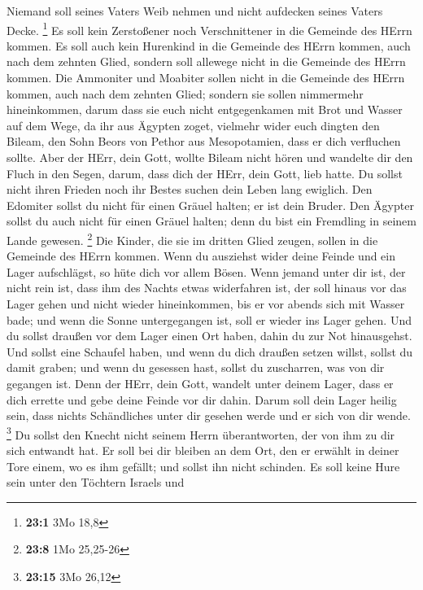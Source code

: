  Niemand soll seines Vaters Weib nehmen und nicht
aufdecken seines Vaters Decke. \footnote{\textbf{23:1} 3Mo 18,8}
 Es soll kein Zerstoßener noch Verschnittener in die
Gemeinde des HErrn kommen.  Es soll auch kein Hurenkind in
die Gemeinde des HErrn kommen, auch nach dem zehnten Glied, sondern soll
allewege nicht in die Gemeinde des HErrn kommen.  Die
Ammoniter und Moabiter sollen nicht in die Gemeinde des HErrn kommen,
auch nach dem zehnten Glied; sondern sie sollen nimmermehr hineinkommen,
 darum dass sie euch nicht entgegenkamen mit Brot und
Wasser auf dem Wege, da ihr aus Ägypten zoget, vielmehr wider euch
dingten den Bileam, den Sohn Beors von Pethor aus Mesopotamien, dass er
dich verfluchen sollte.  Aber der HErr, dein Gott, wollte
Bileam nicht hören und wandelte dir den Fluch in den Segen, darum, dass
dich der HErr, dein Gott, lieb hatte.  Du sollst nicht
ihren Frieden noch ihr Bestes suchen dein Leben lang ewiglich.
 Den Edomiter sollst du nicht für einen Gräuel halten; er
ist dein Bruder. Den Ägypter sollst du auch nicht für einen Gräuel
halten; denn du bist ein Fremdling in seinem Lande gewesen. \footnote{\textbf{23:8}
  1Mo 25,25-26}  Die Kinder, die sie im dritten Glied
zeugen, sollen in die Gemeinde des HErrn kommen.  Wenn du
ausziehst wider deine Feinde und ein Lager aufschlägst, so hüte dich vor
allem Bösen.  Wenn jemand unter dir ist, der nicht rein
ist, dass ihm des Nachts etwas widerfahren ist, der soll hinaus vor das
Lager gehen und nicht wieder hineinkommen,  bis er vor
abends sich mit Wasser bade; und wenn die Sonne untergegangen ist, soll
er wieder ins Lager gehen.  Und du sollst draußen vor dem
Lager einen Ort haben, dahin du zur Not hinausgehst.  Und
sollst eine Schaufel haben, und wenn du dich draußen setzen willst,
sollst du damit graben; und wenn du gesessen hast, sollst du zuscharren,
was von dir gegangen ist.  Denn der HErr, dein Gott,
wandelt unter deinem Lager, dass er dich errette und gebe deine Feinde
vor dir dahin. Darum soll dein Lager heilig sein, dass nichts
Schändliches unter dir gesehen werde und er sich von dir wende.
\footnote{\textbf{23:15} 3Mo 26,12}  Du sollst den Knecht
nicht seinem Herrn überantworten, der von ihm zu dir sich entwandt hat.
 Er soll bei dir bleiben an dem Ort, den er erwählt in
deiner Tore einem, wo es ihm gefällt; und sollst ihn nicht schinden.
 Es soll keine Hure sein unter den Töchtern Israels und
